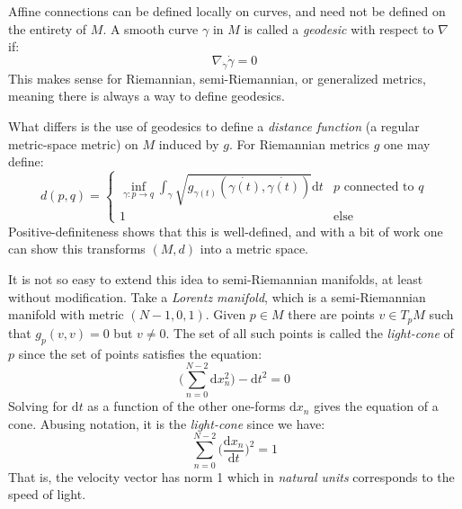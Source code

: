 \documentclass{beamer}
\begin{document}
    \begin{frame}
        Affine connections can be defined locally on curves, and need not be
        defined on the entirety of $M$. A smooth curve $\gamma$ in $M$ is called
        a \textit{geodesic} with respect to $\nabla$ if:
        \begin{equation}
            \nabla_{\dot{\gamma}}\dot{\gamma}=0
        \end{equation}
        This makes sense for Riemannian, semi-Riemannian, or generalized
        metrics, meaning there is always a way to define geodesics.
    \end{frame}
    \begin{frame}
        What differs is the use of geodesics to define a
        \textit{distance function} (a regular metric-space metric) on $M$
        induced by $g$. For Riemannian metrics $g$ one may define:
        \begin{equation}
            d(p,q)=
            \begin{cases}
                \underset{\gamma:p\rightarrow{q}}{\inf}\int_{\gamma}
                    \sqrt{g_{\gamma(t)}(\dot{\gamma(t)},\dot{\gamma(t)})}
                    \textrm{d}t&p\textrm{ connected to }q\\
                1&\textrm{else}
            \end{cases}
        \end{equation}
        Positive-definiteness shows that this is well-defined, and with a
        bit of work one can show this transforms $(M,d)$ into a metric space.
    \end{frame}
    \begin{frame}
        It is not so easy to extend this idea to semi-Riemannian manifolds, at
        least without modification. Take a \textit{Lorentz manifold}, which is
        a semi-Riemannian manifold with metric $(N-1,0,1)$. Given $p\in{M}$
        there are points $v\in{T}_{p}M$ such that
        $g_{p}(v,v)=0$ but $v\ne{0}$. The set of all such points is called the
        \textit{light-cone} of $p$ since the set of points satisfies the
        equation:
        \begin{equation}
            \Big(\sum_{n=0}^{N-2}\textrm{d}x_{n}^{2}\Big)-\textrm{d}t^{2}=0
        \end{equation}
        Solving for $\textrm{d}t$ as a function of the other one-forms
        $\textrm{d}x_{n}$ gives the equation of a cone. Abusing notation, it is
        the \textit{light-cone} since we have:
        \begin{equation}
            \sum_{n=0}^{N-2}\Big(\frac{\textrm{d}x_{n}}{\textrm{d}t}\Big)^{2}=1
        \end{equation}
        That is, the velocity vector has norm 1 which in \textit{natural units}
        corresponds to the speed of light.
    \end{frame}
\end{document}

